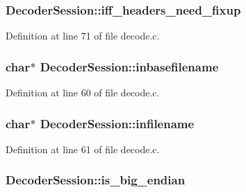 \subsubsection[{\texorpdfstring{iff\+\_\+headers\+\_\+need\+\_\+fixup}{iff_headers_need_fixup}}]{ Decoder\+Session\+::iff\+\_\+headers\+\_\+need\+\_\+fixup}\hypertarget{struct_decoder_session_a4b52a30b9774fc7b7f1dac07af6741a0}{}\label{struct_decoder_session_a4b52a30b9774fc7b7f1dac07af6741a0}


Definition at line 71 of file decode.\+c.

\subsubsection[{\texorpdfstring{inbasefilename}{inbasefilename}}]{ char$\ast$ Decoder\+Session\+::inbasefilename}\hypertarget{struct_decoder_session_ac8a697c59955faa644b7384e4e64f209}{}\label{struct_decoder_session_ac8a697c59955faa644b7384e4e64f209}


Definition at line 60 of file decode.\+c.

\subsubsection[{\texorpdfstring{infilename}{infilename}}]{ char$\ast$ Decoder\+Session\+::infilename}\hypertarget{struct_decoder_session_aad0779eb8507f71616c3712b9d255e54}{}\label{struct_decoder_session_aad0779eb8507f71616c3712b9d255e54}


Definition at line 61 of file decode.\+c.

\subsubsection[{\texorpdfstring{is\+\_\+big\+\_\+endian}{is_big_endian}}]{ Decoder\+Session\+::is\+\_\+big\+\_\+endian}\hypertarget{struct_decoder_session_a1ea442ba13580b691734705d94d44a3b}{}\label{struct_decoder_session_a1ea442ba13580b691734705d94d44a3b}


